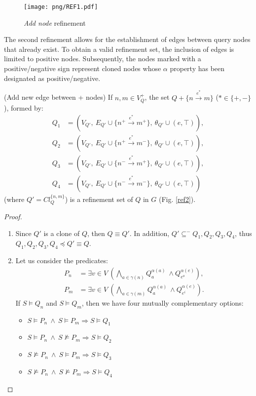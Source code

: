 \documentclass{article}%
\begin{document}
\begin{figure}[h]
    \begin{center}
        \texttt{[image: png/REF1.pdf]}
    \end{center}
    \caption{%
        \textit{Add node} refinement
    }%
    \label{ref1}
\end{figure}

The second refinement allows for the establishment of edges between query nodes that already exist. To obtain a valid refinement set, the inclusion of edges is limited to positive nodes. Subsequently, the nodes marked with a positive/negative sign represent cloned nodes whose $\alpha$ property has been designated as positive/negative.

\begin{theorem}{(Add new edge between + nodes)}
    If $n,m\in V_Q^+$, the set $Q+\{n\stackrel {e^*}{\longrightarrow} m\}$ ($*\in\{+,-\}$), formed by:
    \begin{align*}
    Q_1 &= (V_{Q'},\ E_{Q'}\cup\{n^+\stackrel {e^*}{\longrightarrow} m^+\},\ \theta_{Q'}\cup(e,\top)), \\
    Q_2 &= (V_{Q'},\ E_{Q'}\cup\{n^+\stackrel {e^*}{\longrightarrow} m^-\},\ \theta_{Q'}\cup(e,\top)), \\
    Q_3 &= (V_{Q'},\ E_{Q'}\cup\{n^-\stackrel {e^*}{\longrightarrow} m^+\},\ \theta_{Q'}\cup(e,\top)), \\
    Q_4 &= (V_{Q'},\ E_{Q'}\cup\{n^-\stackrel {e^*}{\longrightarrow} m^-\},\ \theta_{Q'}\cup(e,\top))
\end{align*}
    (where $Q'=Cl_Q^{\{n,m\}}$) is a refinement set of $Q$ in $G$ (Fig. \ref{ref2}).
\end{theorem}
\begin{proof}{}
	\quad
	\begin{enumerate}
		\item Since $Q'$ is a clone of $Q$, then $Q\equiv Q'$. In addition,  $Q'\subseteq^- Q_1,Q_2,Q_3,Q_4$, thus $Q_1,Q_2,Q_3,Q_4\preceq Q'\equiv Q$.
		\item Let us consider the predicates:
		\begin{align*}
		P_n &= \exists v\in V\ \left( \bigwedge_{a\in \gamma(n)} Q_a^{\alpha(a)}\ \wedge Q_{e^o}^{\alpha(e)}\right), \\
		P_m &= \exists v\in V\ \left( \bigwedge_{a\in \gamma(m)} Q_a^{\alpha(a)}\ \wedge Q_{e^i}^{\alpha(e)}\right).
		\end{align*}
		If $S\vDash Q_n$ and $S\vDash Q_m$, then we have four mutually complementary options:
		\begin{itemize}
			\item $S\vDash P_n\ \wedge\ S\vDash P_m \Rightarrow S\vDash Q_1$
			\item $S\vDash P_n\ \wedge\ S\nvDash P_m \Rightarrow S\vDash Q_2$
			\item $S\nvDash P_n\ \wedge\ S\vDash P_m \Rightarrow S\vDash Q_3$
			\item $S\nvDash P_n\ \wedge\ S\nvDash P_m \Rightarrow S\vDash Q_4$
		\end{itemize}
	\end{enumerate}
\end{proof}
\end{document}
